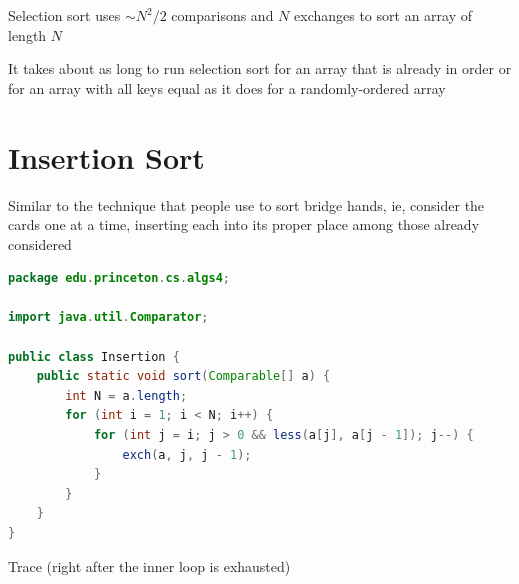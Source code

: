 \documentclass[8pt,a4paper,compress]{beamer}
\begin{document}
\begin{frame}[fragile]
\pause

Selection sort uses $\sim N^2/2$ comparisons and $N$ exchanges to sort an array of length $N$

\pause
\bigskip

It takes about as long to run selection sort for an array that is already in order or for an array with all keys equal as it does for a randomly-ordered array
\end{frame}

\section{Insertion Sort}
\begin{frame}[fragile]
\pause

Similar to the technique that people use to sort bridge hands, ie, consider the cards one at a time, inserting each into its proper place among those already considered

\pause
\bigskip

\begin{lstlisting}[language=Java]
package edu.princeton.cs.algs4;

import java.util.Comparator;

public class Insertion {
    public static void sort(Comparable[] a) {
        int N = a.length;
        for (int i = 1; i < N; i++) {
            for (int j = i; j > 0 && less(a[j], a[j - 1]); j--) {
                exch(a, j, j - 1);
            }
        }
    }
}
\end{lstlisting}
\end{frame}

\begin{frame}[fragile]
\pause

Trace (right after the inner loop is exhausted)
\begin{center}
\end{center}
\end{frame}
\end{document}
